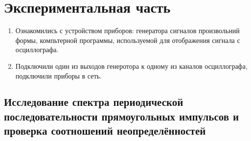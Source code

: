\documentclass[a4paper,12pt]{article} %
\begin{document}
\section{Экспериментальная часть}

\begin{enumerate}
    \item Ознакомились с устройством приборов: генератора сигналов произвольний формы, компьтерной программы, используемой для отображения сигнала с осциллографа.
    \item Подключили один из выходов генеротора к одному из каналов осциллографа, подключили приборы в сеть.
\end{enumerate}

\subsection{Исследование спектра периодической последовательности прямоугольных импульсов и проверка соотношений неопределённостей}
\end{document}
